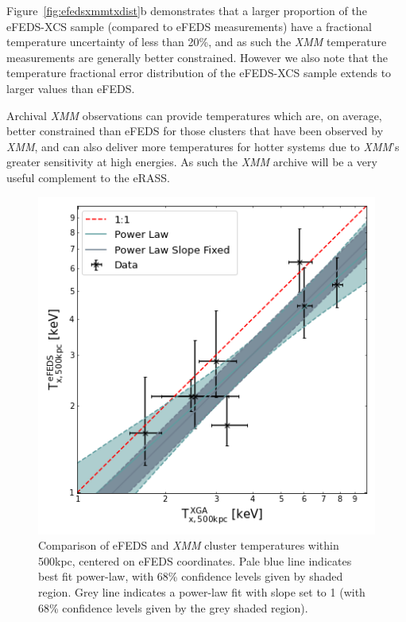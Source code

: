 \documentclass[fleqn,usenatbib]{mnras}
\begin{document}
Figure~\ref{fig:efedsxmmtxdist}b demonstrates that a larger proportion of the eFEDS-XCS sample (compared to eFEDS measurements) have a fractional temperature uncertainty of less than 20\%, and as such the {\em XMM} temperature measurements are generally better constrained. However we also note that the temperature fractional error distribution of the eFEDS-XCS sample extends to larger values than eFEDS. 

Archival {\em XMM} observations can provide temperatures which are, on average, better constrained than eFEDS for those clusters that have been observed by {\em XMM}, and can also deliver more temperatures for hotter systems due to {\em XMM}'s greater sensitivity at high energies.  As such the {\em XMM} archive will be a very useful complement to the eRASS.


\begin{figure}
    \centering
    \includegraphics[width=0.95\columnwidth]{images/efeds_xcs_t500cal.png}
    \caption[]{Comparison of eFEDS and {\em XMM} cluster temperatures within 500kpc, centered on eFEDS coordinates. Pale blue line indicates best fit power-law, with 68\% confidence levels given by shaded region. Grey line indicates a power-law fit with slope set to 1 (with 68\% confidence levels given by the grey shaded region).}
    \label{fig:t500kpccomp}
\end{figure}
\end{document}
